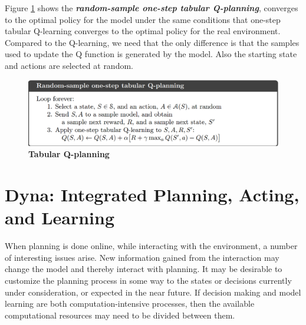 \documentclass[11pt]{article}
\begin{document}
Figure \ref{fig: tabular_q_planning} shows the \emph{\textbf{random-sample one-step tabular Q-planning}}, converges to the optimal policy for the model under the same conditions that one-step tabular Q-learning converges to the optimal policy for the real environment. Compared to the Q-learning, we need that the only difference is that the samples used to update the Q function is generated by the model. Also the starting state and actions are selected at random. 
\begin{figure}
\begin{minipage}[t]{1\linewidth}
  \centering
  \centerline{\includegraphics[scale = 0.3]{tabular_q_planning.png}}
\end{minipage}
\caption{\footnotesize{\textbf{Tabular Q-planning}}}
\label{fig: tabular_q_planning}
\end{figure}

\section{Dyna: Integrated Planning, Acting, and Learning}
When planning is done online, while interacting with the environment, a number of interesting issues arise. New information gained from the interaction may change the
model and thereby interact with planning. It may be desirable to customize the planning process in some way to the states or decisions currently under consideration, or expected in the near future. If decision making and model learning are both computation-intensive processes, then the available computational resources may need to be divided between them.
\end{document}

